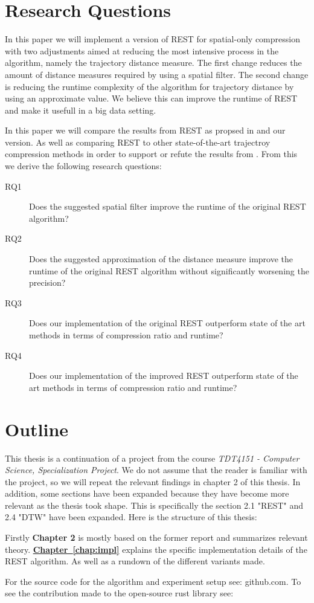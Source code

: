 \section{Research Questions}
In this paper we will implement a version of REST for spatial-only compression with two adjustments aimed at reducing the most intensive process in the algorithm, namely the trajectory distance measure. The first change reduces the amount of distance measures required by using a spatial filter. The second change is reducing the runtime complexity of the algorithm for trajectory distance by using an approximate value. We believe this can improve the runtime of REST and make it usefull in a big data setting.

In this paper we will compare the results from REST as propsed in \cite{zhao2018rest} and our version. As well as comparing REST to other state-of-the-art trajectroy compression methods in order to support or refute the results from \cite{zhao2018rest}. From this we derive the following research questions:

\begin{description}
    \item[RQ1] Does the suggested spatial filter improve the runtime of the original REST algorithm?
    \item[RQ2] Does the suggested approximation of the distance measure improve the runtime of the original REST algorithm without significantly worsening the precision?
    \item[RQ3] Does our implementation of the original REST outperform state of the art methods in terms of compression ratio and runtime?
    \item[RQ4] Does our implementation of the improved REST outperform state of the art methods in terms of compression ratio and runtime?
\end{description}

\section{Outline}
This thesis is a continuation of a project from the course \textit{TDT4151 - Computer Science, Specialization Project}. We do not assume that the reader is familiar with the project, so we will repeat the relevant findings in chapter 2 of this thesis. In addition, some sections have been expanded because they have become more relevant as the thesis took shape. This is specifically the section 2.1 "REST" and 2.4 "DTW" have been expanded. Here is the structure of this thesis:

Firstly \textbf{Chapter 2} is mostly based on the former report and summarizes relevant theory.
\newline
\textbf{\hyperref[chap:impl]{Chapter~\ref*{chap:impl}}} explains the specific implementation details of the REST algorithm. As well as a rundown of the different variants made.

For the source code for the algorithm and experiment setup see: github.com. To see the contribution made to the open-source rust library see:

